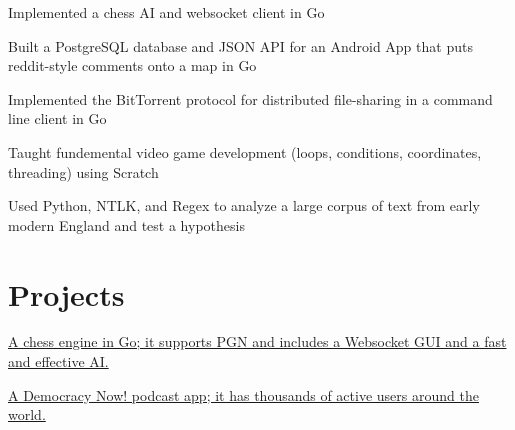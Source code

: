 \documentclass[]{deedy-resume-openfont}
\begin{document}
\vspace{\topsep} %
\begin{tightemize}
\item Implemented a chess AI and websocket client in Go
\item Built a PostgreSQL database and JSON API for an Android App that puts reddit-style comments onto a map in Go
\item Implemented the BitTorrent protocol for distributed file-sharing in a command line client in Go
\end{tightemize}
\sectionsep

\vspace{\topsep} %
\begin{tightemize}
\item Taught fundemental video game development (loops, conditions, coordinates, threading) using Scratch
\end{tightemize}
\sectionsep

\vspace{\topsep} %
\begin{tightemize}
\item Used Python, NTLK, and Regex to analyze a large corpus of text from early modern England and test a hypothesis
\end{tightemize}


\section{Projects}
\href{https://ghess-chess.herokuapp.com/}{A chess engine in Go; it supports PGN and includes a Websocket GUI and a fast and effective AI.}
\sectionsep

\href{https://play.google.com/store/apps/details?id=com.workingagenda.democracydroid}{A Democracy Now! podcast app; it has thousands of active users around the world.}
\sectionsep
\end{document}
